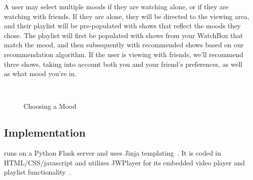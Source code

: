 A user may select multiple moods if they are watching alone, or if
they are watching with friends.  If they are alone, they will be
directed to the viewing area, and their playlist will be pre-populated
with shows that reflect the moods they chose.  The playlist will first
be populated with shows from your WatchBox that match the mood, and
then subsequently with recommended shows based on our recommendation
algorithm.  If the user is viewing with friends, we’ll recommend three
shows, taking into account both you and your friend’s preferences, as
well as what mood you’re in.

\begin{figure}
\centering
{}
~~
\caption{Choosing a Mood}
\label{fig:mood}
\end{figure}

\subsection{Implementation}
{\sys} runs on a Python Flask server and uses Jinja
templating~\cite{flask,jinja}.  It is coded in HTML/CSS/javascript and utilizes JWPlayer
for its embedded video player and playlist functionality~\cite{jwplayer}.
